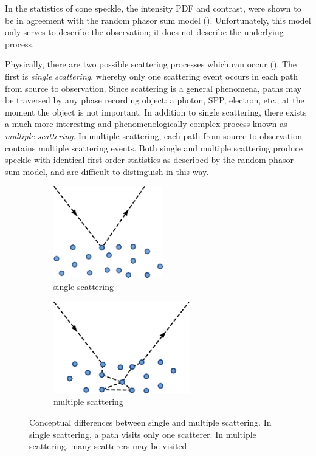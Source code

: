 In  the statistics of cone speckle, the intensity PDF and
contrast, were shown to be in agreement with the random phasor sum model
().  Unfortunately, this model only serves to describe
the observation; it does not describe the underlying process.

Physically, there are two possible scattering processes which can occur
().  The first is \textit{single scattering},
whereby only one scattering event occurs in each path from source to
observation.  Since scattering is a general phenomena, paths may be traversed
by any phase recording object: a photon, SPP, electron, etc.; at the moment
the object is not important.  In addition to single scattering, there exists a
much more interesting and phenomenologically complex process known as
\textit{multiple scattering}.  In multiple scattering, each path from source
to observation contains multiple scattering events.  Both single
and multiple scattering produce speckle with identical first order statistics
as described by the random phasor sum model, and are difficult to distinguish
in this way.
\begin{figure}[ht]
\centering
\begin{subfigure}[b]{5cm}
\includegraphics[keepaspectratio,height=4cm]{scatteringmicro/figures/singlescattering}
\caption{single scattering}
\end{subfigure}
\hspace{2cm}
\begin{subfigure}[b]{5cm}
\includegraphics[keepaspectratio,height=4cm]{scatteringmicro/figures/multiplescattering}
\caption{multiple scattering}
\end{subfigure}
\caption{Conceptual differences between single and multiple scattering.  In
single scattering, a path visits only one scatterer.  In multiple scattering,
many scatterers may be visited.}
\label{fig:scattsinglevmultiple}
\end{figure}

